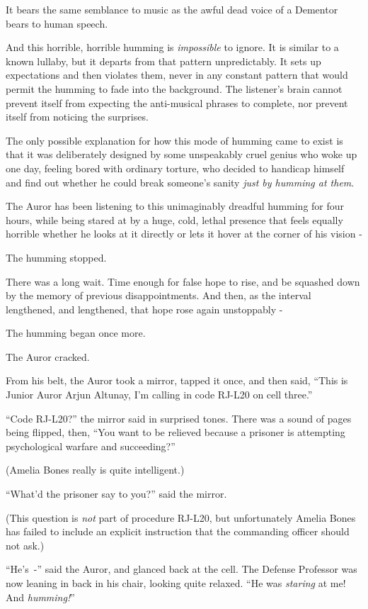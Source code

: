 It bears the same semblance to music as the awful dead voice of a Dementor bears to human speech.

And this horrible, horrible humming is \emph{impossible} to ignore. It is similar to a known lullaby, but it departs from that pattern unpredictably. It sets up expectations and then violates them, never in any constant pattern that would permit the humming to fade into the background. The listener's brain cannot prevent itself from expecting the anti-musical phrases to complete, nor prevent itself from noticing the surprises.

The only possible explanation for how this mode of humming came to exist is that it was deliberately designed by some unspeakably cruel genius who woke up one day, feeling bored with ordinary torture, who decided to handicap himself and find out whether he could break someone's sanity \emph{just by humming at them}.

The Auror has been listening to this unimaginably dreadful humming for four hours, while being stared at by a huge, cold, lethal presence that feels equally horrible whether he looks at it directly or lets it hover at the corner of his vision -

The humming stopped.

There was a long wait. Time enough for false hope to rise, and be squashed down by the memory of previous disappointments. And then, as the interval lengthened, and lengthened, that hope rose again unstoppably -

The humming began once more.

The Auror cracked.

From his belt, the Auror took a mirror, tapped it once, and then said, ``This is Junior Auror Arjun Altunay, I'm calling in code RJ-L20 on cell three.''

``Code RJ-L20?'' the mirror said in surprised tones. There was a sound of pages being flipped, then, ``You want to be relieved because a prisoner is attempting psychological warfare and succeeding?''

(Amelia Bones really is quite intelligent.)

``What'd the prisoner say to you?'' said the mirror.

(This question is \emph{not} part of procedure RJ-L20, but unfortunately Amelia Bones has failed to include an explicit instruction that the commanding officer should not ask.)

``He's~-'' said the Auror, and glanced back at the cell. The Defense Professor was now leaning in back in his chair, looking quite relaxed. ``He was \emph{staring} at me! And \emph{humming!}''

